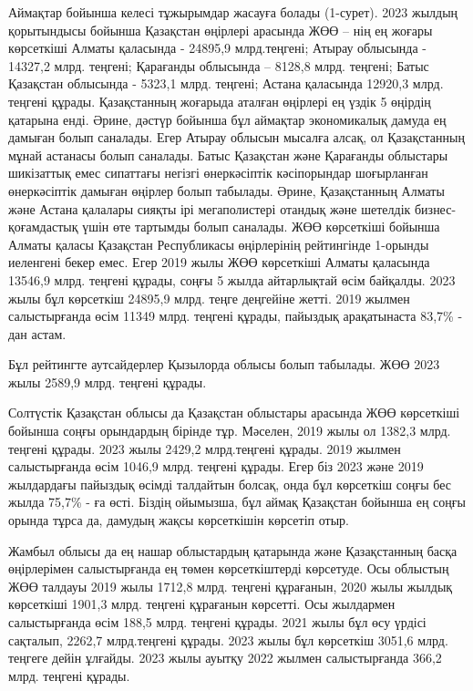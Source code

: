 \begin{multicols}{2}
Аймақтар бойынша келесі тұжырымдар жасауға болады (1-сурет). 2023 жылдың
қорытындысы бойынша Қазақстан өңірлері арасында ЖӨӨ -- нің ең жоғары
көрсеткіші Алматы қаласында - 24895,9 млрд.теңгені; Атырау облысында -
14327,2 млрд. теңгені; Қарағанды облысында -- 8128,8 млрд. теңгені;
Батыс Қазақстан облысында - 5323,1 млрд. теңгені; Астана қаласында
12920,3 млрд. теңгені құрады. Қазақстанның жоғарыда аталған өңірлері ең
үздік 5 өңірдің қатарына енді. Әрине, дәстүр бойынша бұл аймақтар
экономикалық дамуда ең дамыған болып саналады. Егер Атырау облысын
мысалға алсақ, ол Қазақстанның мұнай астанасы болып саналады. Батыс
Қазақстан және Қарағанды облыстары шикізаттық емес сипаттағы негізгі
өнеркәсіптік кәсіпорындар шоғырланған өнеркәсіптік дамыған өңірлер болып
табылады. Әрине, Қазақстанның Алматы және Астана қалалары сияқты ірі
мегаполистері отандық және шетелдік бизнес-қоғамдастық үшін өте тартымды
болып саналады. ЖӨӨ көрсеткіші бойынша Алматы қаласы Қазақстан
Республикасы өңірлерінің рейтингінде 1-орынды иеленгені бекер емес. Егер
2019 жылы ЖӨӨ көрсеткіші Алматы қаласында 13546,9 млрд. теңгені құрады,
соңғы 5 жылда айтарлықтай өсім байқалды. 2023 жылы бұл көрсеткіш 24895,9
млрд. теңге деңгейіне жетті. 2019 жылмен салыстырғанда өсім 11349 млрд.
теңгені құрады, пайыздық арақатынаста 83,7\% - дан астам.

Бұл рейтингте аутсайдерлер Қызылорда облысы болып табылады. ЖӨӨ 2023
жылы 2589,9 млрд. теңгені құрады.

Солтүстік Қазақстан облысы да Қазақстан облыстары арасында ЖӨӨ
көрсеткіші бойынша соңғы орындардың бірінде тұр. Мәселен, 2019 жылы ол
1382,3 млрд. теңгені құрады. 2023 жылы 2429,2 млрд.теңгені құрады. 2019
жылмен салыстырғанда өсім 1046,9 млрд. теңгені құрады. Егер біз 2023
және 2019 жылдардағы пайыздық өсімді талдайтын болсақ, онда бұл
көрсеткіш соңғы бес жылда 75,7\% - ға өсті. Біздің ойымызша, бұл аймақ
Қазақстан бойынша ең соңғы орында тұрса да, дамудың жақсы көрсеткішін
көрсетіп отыр.

Жамбыл облысы да ең нашар облыстардың қатарында және Қазақстанның басқа
өңірлерімен салыстырғанда ең төмен көрсеткіштерді көрсетуде. Осы
облыстың ЖӨӨ талдауы 2019 жылы 1712,8 млрд. теңгені құрағанын, 2020 жылы
жылдық көрсеткіші 1901,3 млрд. теңгені құрағанын көрсетті. Осы жылдармен
салыстырғанда өсім 188,5 млрд. теңгені құрады. 2021 жылы бұл өсу үрдісі
сақталып, 2262,7 млрд.теңгені құрады. 2023 жылы бұл көрсеткіш 3051,6
млрд. теңгеге дейін ұлғайды. 2023 жылы ауытқу 2022 жылмен салыстырғанда
366,2 млрд. теңгені құрады.
\end{multicols}


